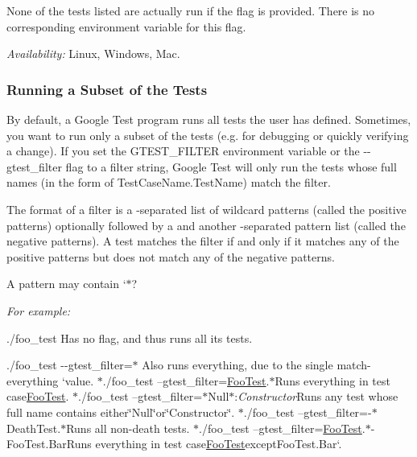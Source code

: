 None of the tests listed are actually run if the flag is provided. There is no corresponding environment variable for this flag.

{\itshape Availability\+:} Linux, Windows, Mac.

\subsubsection*{Running a Subset of the Tests}

By default, a Google Test program runs all tests the user has defined. Sometimes, you want to run only a subset of the tests (e.\+g. for debugging or quickly verifying a change). If you set the {\ttfamily G\+T\+E\+S\+T\+\_\+\+F\+I\+L\+T\+ER} environment variable or the {\ttfamily -\/-\/gtest\+\_\+filter} flag to a filter string, Google Test will only run the tests whose full names (in the form of {\ttfamily Test\+Case\+Name.\+Test\+Name}) match the filter.

The format of a filter is a \textquotesingle{}{\ttfamily \+:}\textquotesingle{}-\/separated list of wildcard patterns (called the positive patterns) optionally followed by a \textquotesingle{}{\ttfamily -\/}\textquotesingle{} and another \textquotesingle{}{\ttfamily \+:}\textquotesingle{}-\/separated pattern list (called the negative patterns). A test matches the filter if and only if it matches any of the positive patterns but does not match any of the negative patterns.

A pattern may contain `\textquotesingle{}$\ast$\textquotesingle{}?

{\itshape For example\+:}

{\itshape 
\begin{DoxyItemize}
\item {\ttfamily ./foo\+\_\+test} Has no flag, and thus runs all its tests.
\item {\ttfamily ./foo\+\_\+test -\/-\/gtest\+\_\+filter=$\ast$} Also runs everything, due to the single match-\/everything `{\ttfamily value. $\ast$}./foo\+\_\+test --gtest\+\_\+filter=\hyperlink{class_foo_test}{Foo\+Test}.$\ast${\ttfamily Runs everything in test case}\hyperlink{class_foo_test}{Foo\+Test}{\ttfamily . $\ast$}./foo\+\_\+test --gtest\+\_\+filter=$\ast$\+Null$\ast$\+:{\itshape Constructor}{\ttfamily Runs any test whose full name contains either}\char`\"{}\+Null\char`\"{}{\ttfamily or}\char`\"{}\+Constructor\char`\"{}{\ttfamily . $\ast$}./foo\+\_\+test --gtest\+\_\+filter=-\/$\ast$\+Death\+Test.$\ast${\ttfamily Runs all non-\/death tests. $\ast$}./foo\+\_\+test --gtest\+\_\+filter=\hyperlink{class_foo_test}{Foo\+Test}.$\ast$-\/\+Foo\+Test.Bar{\ttfamily Runs everything in test case}\hyperlink{class_foo_test}{Foo\+Test}{\ttfamily except}Foo\+Test.\+Bar`.
\end{DoxyItemize}}

